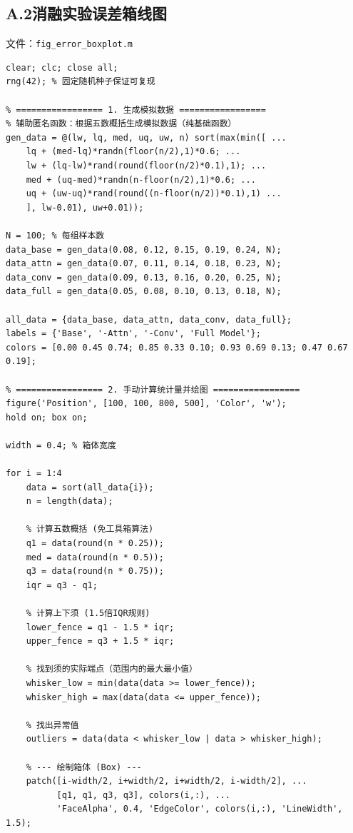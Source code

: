 \documentclass[twocolumn,a4paper]{ctexart}
\numberwithin{equation}{section}
\begin{document}
\subsection*{A.2\quad 消融实验误差箱线图}
\label{app:boxplot_code}

文件：\texttt{fig\_error\_boxplot.m}

\begin{lstlisting}[caption={各模型预测误差分布箱线图绘图代码},label={lst:boxplot}]
clear; clc; close all;
rng(42); % 固定随机种子保证可复现

% ================= 1. 生成模拟数据 =================
% 辅助匿名函数：根据五数概括生成模拟数据（纯基础函数）
gen_data = @(lw, lq, med, uq, uw, n) sort(max(min([ ...
    lq + (med-lq)*randn(floor(n/2),1)*0.6; ...
    lw + (lq-lw)*rand(round(floor(n/2)*0.1),1); ...
    med + (uq-med)*randn(n-floor(n/2),1)*0.6; ...
    uq + (uw-uq)*rand(round((n-floor(n/2))*0.1),1) ...
    ], lw-0.01), uw+0.01));

N = 100; % 每组样本数
data_base = gen_data(0.08, 0.12, 0.15, 0.19, 0.24, N);
data_attn = gen_data(0.07, 0.11, 0.14, 0.18, 0.23, N);
data_conv = gen_data(0.09, 0.13, 0.16, 0.20, 0.25, N);
data_full = gen_data(0.05, 0.08, 0.10, 0.13, 0.18, N);

all_data = {data_base, data_attn, data_conv, data_full};
labels = {'Base', '-Attn', '-Conv', 'Full Model'};
colors = [0.00 0.45 0.74; 0.85 0.33 0.10; 0.93 0.69 0.13; 0.47 0.67 0.19];

% ================= 2. 手动计算统计量并绘图 =================
figure('Position', [100, 100, 800, 500], 'Color', 'w');
hold on; box on;

width = 0.4; % 箱体宽度

for i = 1:4
    data = sort(all_data{i});
    n = length(data);
    
    % 计算五数概括 (免工具箱算法)
    q1 = data(round(n * 0.25));
    med = data(round(n * 0.5));
    q3 = data(round(n * 0.75));
    iqr = q3 - q1;
    
    % 计算上下须 (1.5倍IQR规则)
    lower_fence = q1 - 1.5 * iqr;
    upper_fence = q3 + 1.5 * iqr;
    
    % 找到须的实际端点（范围内的最大最小值）
    whisker_low = min(data(data >= lower_fence));
    whisker_high = max(data(data <= upper_fence));
    
    % 找出异常值
    outliers = data(data < whisker_low | data > whisker_high);
    
    % --- 绘制箱体 (Box) ---
    patch([i-width/2, i+width/2, i+width/2, i-width/2], ...
          [q1, q1, q3, q3], colors(i,:), ...
          'FaceAlpha', 0.4, 'EdgeColor', colors(i,:), 'LineWidth', 1.5);
          

\end{lstlisting}
\end{document}
